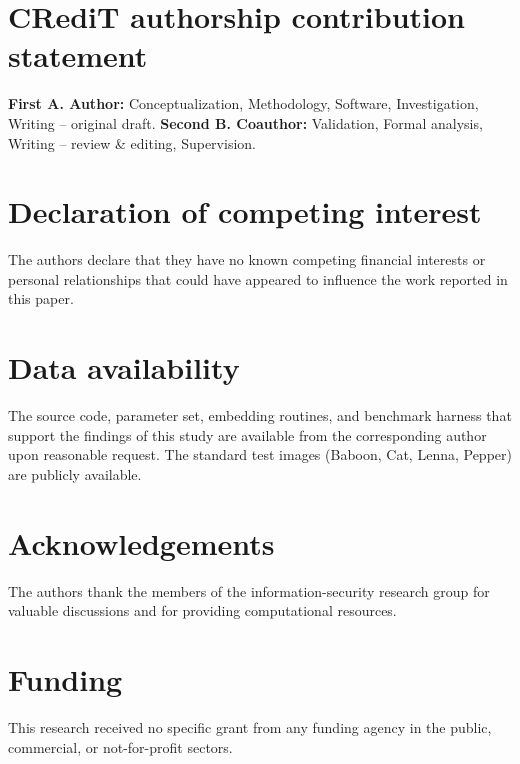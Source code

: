 \documentclass[preprint,12pt,number]{elsarticle}
\begin{document}
\section*{CRediT authorship contribution statement}
\textbf{First A. Author:} Conceptualization, Methodology, Software,
Investigation, Writing -- original draft. \textbf{Second B. Coauthor:}
Validation, Formal analysis, Writing -- review \& editing, Supervision.

\section*{Declaration of competing interest}
The authors declare that they have no known competing financial interests or
personal relationships that could have appeared to influence the work reported
in this paper.

\section*{Data availability}
The source code, parameter set, embedding routines, and benchmark harness that
support the findings of this study are available from the corresponding author
upon reasonable request. The standard test images (Baboon, Cat, Lenna, Pepper)
are publicly available.

\section*{Acknowledgements}
The authors thank the members of the information-security research group for
valuable discussions and for providing computational resources.

\section*{Funding}
This research received no specific grant from any funding agency in the public,
commercial, or not-for-profit sectors.



\end{document}
